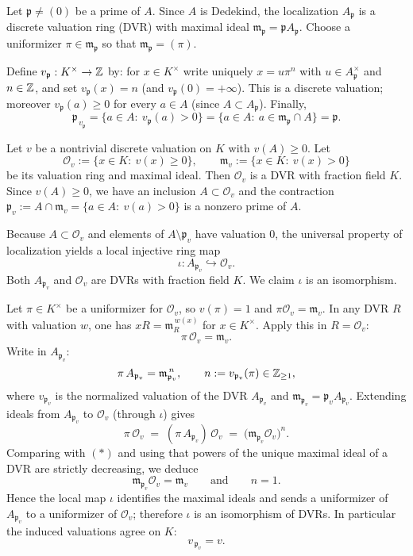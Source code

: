 \documentclass[12pt]{article}  %
\newcommand{\fp}{\mathfrak{p}}
\newcommand{\m}{\mathfrak{m}}
\newcommand{\OO}{\mathcal{O}}
\begin{document}
\begin{solution}
Let $\fp\ne(0)$ be a prime of $A$. Since $A$ is Dedekind, the localization
$A_\fp$ is a discrete valuation ring (DVR) with maximal ideal
$\m_\fp=\fp A_\fp$. Choose a uniformizer $\pi\in\m_\fp$ so that
$\m_\fp=(\pi)$.

Define $v_\fp:K^\times\to\Bbb Z$ by: for $x\in K^\times$ write uniquely
$x=u\pi^n$ with $u\in A_\fp^\times$ and $n\in\Bbb Z$, and set $v_\fp(x)=n$
(and $v_\fp(0)=+\infty$).
This is a discrete valuation; moreover $v_\fp(a)\ge0$ for every $a\in A$
(since $A\subset A_\fp$).
Finally,
\[
\fp_{\,v_\fp}=\{a\in A:\ v_\fp(a)>0\}=\{a\in A:\ a\in \m_\fp\cap A\}=\fp.
\]

Let $v$ be a nontrivial discrete valuation on $K$ with $v(A)\ge0$.
Let
\[
\OO_v:=\{x\in K:\ v(x)\ge0\},\qquad \m_v:=\{x\in K:\ v(x)>0\}
\]
be its valuation ring and maximal ideal. Then $\OO_v$ is a DVR with fraction
field $K$. Since $v(A)\ge0$, we have an inclusion $A\subset\OO_v$ and the
contraction $\fp_v:=A\cap\m_v=\{a\in A:\ v(a)>0\}$ is a nonzero prime of $A$.

Because $A\subset\OO_v$ and elements of $A\setminus\fp_v$ have valuation $0$,
the universal property of localization yields a local injective ring map
\[
\iota: A_{\fp_v}\hookrightarrow \OO_v .
\]
Both $A_{\fp_v}$ and $\OO_v$ are DVRs with fraction field $K$. We claim
$\iota$ is an isomorphism.

Let $\pi\in K^\times$ be a uniformizer for $\OO_v$, so $v(\pi)=1$ and
$\pi\OO_v=\m_v$. In any DVR $R$ with valuation $w$, one has 
$xR = \m_R^{\,w(x)}$ for $x\in K^\times$. Apply this in
$R=\OO_v$:
\[
\pi\,\OO_v=\m_v. \tag{$\ast$}
\]
Write in $A_{\fp_v}$:
\[
\pi\,A_{\fp_v}=\m_{\fp_v}^{\,n}, \qquad n:=v_{\fp_v}(\pi)\in\Bbb Z_{\ge1},
\]
where $v_{\fp_v}$ is the normalized valuation of the DVR $A_{\fp_v}$
and $\m_{\fp_v}=\fp_vA_{\fp_v}$. Extending ideals from $A_{\fp_v}$ to $\OO_v$
(through $\iota$) gives
\[
\pi\,\OO_v \;=\; (\pi\,A_{\fp_v})\,\OO_v
\;=\; \big(\m_{\fp_v}\OO_v\big)^{n}.
\]
Comparing with $(\ast)$ and using that powers of the unique maximal ideal of a
DVR are strictly decreasing, we deduce
\[
\m_{\fp_v}\OO_v=\m_v\qquad\text{and}\qquad n=1.
\]
Hence the local map $\iota$ identifies the maximal ideals and sends a
uniformizer of $A_{\fp_v}$ to a uniformizer of $\OO_v$; therefore $\iota$ is
an isomorphism of DVRs. In particular the induced valuations agree on $K$:
\[
v_{\,\fp_v}=v.
\]
\end{solution}
\end{document}
